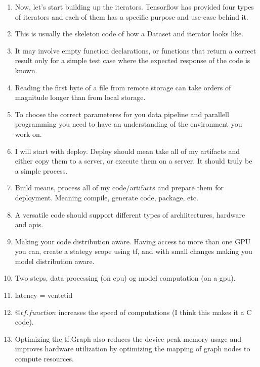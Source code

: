 \begin{enumerate}
    \item Now, let’s start building up the iterators. Tensorflow has provided four types of iterators and each of them has a specific purpose and use-case behind it.
    \item This is usually the skeleton code of how a Dataset and iterator looks like.
    \item It may involve empty function declarations, or functions that return a correct result only for a simple test case where the expected response of the code is known.
    \item Reading the first byte of a file from remote storage can take orders of magnitude longer than from local storage.
    
    \item To choose the correct parameteres for you data pipeline and parallell programming you need to have an understanding of the environment you work on.
    \item I will start with deploy. Deploy should mean take all of my artifacts and either copy them to a server, or execute them on a server. It should truly be a simple process.
    \item Build means, process all of my code/artifacts and prepare them for deployment. Meaning compile, generate code, package, etc.
    \item A versatile code should support different types of archiitectures, hardware and apis.
    \item Making your code distribution aware. Having access to more than one GPU you can, create a stategy scope using tf, and with small changes making you model distribution aware.
    \item Two steps, data processing (on cpu) og model computation (on a gpu).
    \item latency = ventetid
    \item $@tf.function$ increases the speed of computations (I think this makes it a C code).
    \item Optimizing the tf.Graph also reduces the device peak memory usage and improves hardware utilization by optimizing the mapping of graph nodes to compute resources. 
\end{enumerate}